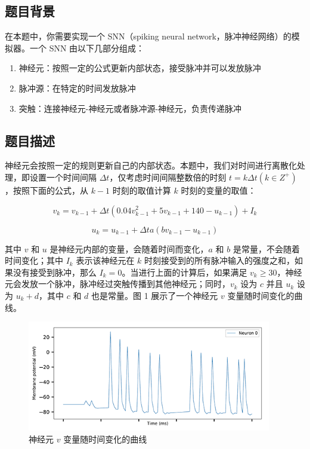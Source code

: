 \subsection*{题目背景}

在本题中，你需要实现一个 SNN（spiking neural network，脉冲神经网络）的模拟器。一个 SNN 由以下几部分组成：

\begin{enumerate}
    \item 神经元：按照一定的公式更新内部状态，接受脉冲并可以发放脉冲
    \item 脉冲源：在特定的时间发放脉冲
    \item 突触：连接神经元-神经元或者脉冲源-神经元，负责传递脉冲
\end{enumerate}

\subsection*{题目描述}


神经元会按照一定的规则更新自己的内部状态。本题中，我们对时间进行离散化处理，即设置一个时间间隔 $\Delta{t}$，仅考虑时间间隔整数倍的时刻 $t=k\Delta{t}(k \in Z^+)$，按照下面的公式，从 $k-1$ 时刻的取值计算 $k$ 时刻的变量的取值：

\begin{equation*}
    v_k=v_{k-1} + \Delta{t}(0.04v_{k-1}^2 + 5v_{k-1} + 140 - u_{k-1}) + I_k
\end{equation*}

\begin{equation*}
    u_k=u_{k-1} + \Delta{t}a(bv_{k-1} - u_{k-1})
\end{equation*}

其中 $v$ 和 $u$ 是神经元内部的变量，会随着时间而变化，$a$ 和 $b$ 是常量，不会随着时间变化；其中 $I_k$ 表示该神经元在 $k$ 时刻接受到的所有脉冲输入的强度之和，如果没有接受到脉冲，那么 $I_k=0$。当进行上面的计算后，如果满足 $v_k \ge 30$，神经元会发放一个脉冲，脉冲经过突触传播到其他神经元；同时，$v_k$ 设为 $c$ 并且 $u_k$ 设为 $u_k + d$，其中 $c$ 和 $d$ 也是常量。图 1 展示了一个神经元 $v$ 变量随时间变化的曲线。

\begin{figure}[H]
    \centering
    \includegraphics[width=0.95\textwidth]{image/23/3-p-1.png}
    \caption{神经元 $v$ 变量随时间变化的曲线}
\end{figure}

